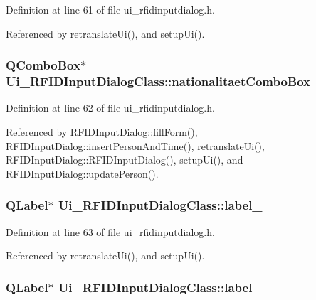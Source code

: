 Definition at line 61 of file ui\_\-rfidinputdialog.h.

Referenced by retranslateUi(), and setupUi().\hypertarget{class_ui___r_f_i_d_input_dialog_class_178fa80ddddaf49ec9096cb08cc76494}{
\subsubsection[nationalitaetComboBox]{\setlength{\rightskip}{0pt plus 5cm}QComboBox$\ast$ {\bf Ui\_\-RFIDInputDialogClass::nationalitaetComboBox}}}
\label{class_ui___r_f_i_d_input_dialog_class_178fa80ddddaf49ec9096cb08cc76494}




Definition at line 62 of file ui\_\-rfidinputdialog.h.

Referenced by RFIDInputDialog::fillForm(), RFIDInputDialog::insertPersonAndTime(), retranslateUi(), RFIDInputDialog::RFIDInputDialog(), setupUi(), and RFIDInputDialog::updatePerson().\hypertarget{class_ui___r_f_i_d_input_dialog_class_18ee17862fad2848d73792eb1ee20cc5}{
\subsubsection[label\_\-11]{\setlength{\rightskip}{0pt plus 5cm}QLabel$\ast$ {\bf Ui\_\-RFIDInputDialogClass::label\_}}}
\label{class_ui___r_f_i_d_input_dialog_class_18ee17862fad2848d73792eb1ee20cc5}




Definition at line 63 of file ui\_\-rfidinputdialog.h.

Referenced by retranslateUi(), and setupUi().\hypertarget{class_ui___r_f_i_d_input_dialog_class_a3cb61f7b53e090f1bb9750ec9774d8e}{
\subsubsection[label\_\-8]{\setlength{\rightskip}{0pt plus 5cm}QLabel$\ast$ {\bf Ui\_\-RFIDInputDialogClass::label\_}}}
\label{class_ui___r_f_i_d_input_dialog_class_a3cb61f7b53e090f1bb9750ec9774d8e}




